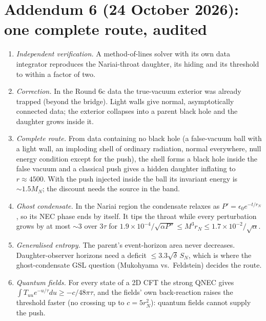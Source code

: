 \documentclass[11pt,a4paper]{article}
\theoremstyle{remark}\newtheorem{remark}[theorem]{Remark}
\begin{document}
\section*{Addendum 6 (24 October 2026): one complete route, audited}
\begin{enumerate}
\item \emph{Independent verification.} A method-of-lines solver with its own data integrator reproduces the Nariai-throat daughter, its hiding and its
threshold to within a factor of two.
\item \emph{Correction.} In the Round 6c data the true-vacuum exterior was already trapped (beyond the bridge). Light walls give normal, asymptotically
connected data; the exterior collapses into a parent black hole and the daughter grows inside it.
\item \emph{Complete route.} From data containing no black hole (a false-vacuum ball with a light wall, an imploding shell of ordinary radiation, normal
everywhere, null energy condition except for the push), the shell forms a black hole inside the false vacuum and a classical push gives a hidden daughter
inflating to $r\approx4500$. With the push injected inside the ball its invariant energy is $\sim1.5M_N$; the discount needs the source in the band.
\item \emph{Ghost condensate.} In the Nariai region the condensate relaxes as $P'=\epsilon_0e^{-t/r_N}$, so its NEC phase ends by itself. It tips the
throat while every perturbation grows by at most $\sim3$ over $3\tau$ for $1.9\times10^{-4}/\sqrt{\alpha P''}\le M^3r_N\le1.7\times10^{-2}/\sqrt\alpha$.
\item \emph{Generalised entropy.} The parent's event-horizon area never decreases. Daughter-observer horizons need a deficit $\le3.3\sqrt\delta\,S_N$, which
is where the ghost-condensate GSL question (Mukohyama vs.\ Feldstein) decides the route.
\item \emph{Quantum fields.} For every state of a 2D CFT the strong QNEC gives $\int T_{uu}e^{-u/\tau}du\ge-c/48\pi\tau$, and the fields' own
back-reaction raises the threshold faster (no crossing up to $c=5r_N^2$): quantum fields cannot supply the push.
\end{enumerate}
\end{document}

